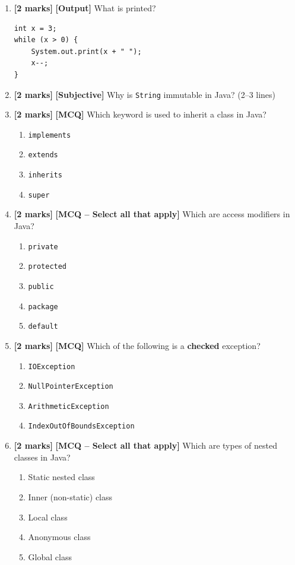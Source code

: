 \documentclass[11pt,a4paper]{article}
\newcommand{\EMarks}{\textbf{[2 marks]} }
\begin{document}
\begin{enumerate}[label=\textbf{E\arabic*.}, leftmargin=*]
  \item \EMarks \textbf{[Output]} What is printed?
    \begin{lstlisting}
int x = 3;
while (x > 0) {
    System.out.print(x + " ");
    x--;
}
    \end{lstlisting}

  \item \EMarks \textbf{[Subjective]} Why is \texttt{String} immutable in Java? (2--3 lines)

  \item \EMarks \textbf{[MCQ]} Which keyword is used to inherit a class in Java?
    \begin{enumerate}[label=(\Alph*), leftmargin=*]
      \item \texttt{implements}
      \item \texttt{extends}
      \item \texttt{inherits}
      \item \texttt{super}
    \end{enumerate}

  \item \EMarks \textbf{[MCQ -- Select all that apply]} Which are access modifiers in Java?
    \begin{enumerate}[label=(\Alph*), leftmargin=*]
      \item \texttt{private}
      \item \texttt{protected}
      \item \texttt{public}
      \item \texttt{package}
      \item \texttt{default}
    \end{enumerate}

  \item \EMarks \textbf{[MCQ]} Which of the following is a \textbf{checked} exception?
    \begin{enumerate}[label=(\Alph*), leftmargin=*]
      \item \texttt{IOException}
      \item \texttt{NullPointerException}
      \item \texttt{ArithmeticException}
      \item \texttt{IndexOutOfBoundsException}
    \end{enumerate}

  \item \EMarks \textbf{[MCQ -- Select all that apply]} Which are types of nested classes in Java?
    \begin{enumerate}[label=(\Alph*), leftmargin=*]
      \item Static nested class
      \item Inner (non-static) class
      \item Local class
      \item Anonymous class
      \item Global class
    \end{enumerate}
\end{enumerate}
\end{document}
